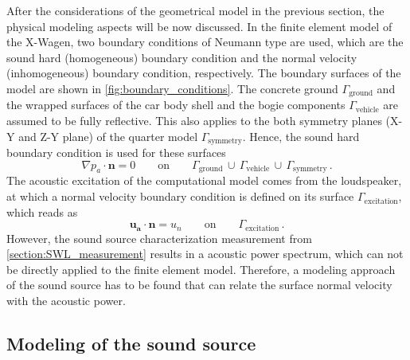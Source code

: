 After the considerations of the geometrical model in the previous section, the physical modeling aspects will be now discussed. 
In the finite element model of the X-Wagen, two boundary conditions of Neumann type are used, which are the sound hard (homogeneous) boundary condition and the normal velocity (inhomogeneous) boundary condition, respectively. 
The boundary surfaces of the model are shown in \cref{fig:boundary_conditions}. The concrete ground $\Gamma_{\text{ground}}$ and the wrapped surfaces of the car body shell and the bogie components $\Gamma_{\text{vehicle}}$ are assumed to be fully reflective. 
This also applies to the both symmetry planes (X-Y and Z-Y plane) of the quarter model $\Gamma_{\text{symmetry}}$. Hence, the sound hard boundary condition is used for these surfaces
\begin{equation}
	\nabla p_a \cdot \boldsymbol{n} = 0\qquad\text{on}\qquad\Gamma_{\text{ground}}\,\cup\,\Gamma_{\text{vehicle}}\,\cup\,\Gamma_{\text{symmetry}}\,.
\end{equation}
The acoustic excitation of the computational model comes from the loudspeaker, at which a normal velocity boundary condition is defined on its surface $\Gamma_{\text{excitation}}$, which reads as
\begin{equation}
	\boldsymbol{u_a} \cdot \boldsymbol{n} = u_{n}\qquad\text{on}\qquad\Gamma_{\text{excitation}}\,.
\end{equation}
However, the sound source characterization measurement from \cref{section:SWL_measurement} results in a acoustic power spectrum, which can not be directly applied to the finite element model. Therefore, a modeling approach of the sound source has to be found that can relate the surface normal velocity with the acoustic power.

\subsection*{Modeling of the sound source}


